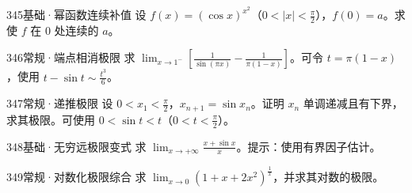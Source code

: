 \begin{exercise}{345}{基础·幂函数连续补值}
设 $f(x)=(\cos x)^{x^2}$（$0<|x|<\frac{\pi}{2}$），$f(0)=a$。求使 $f$ 在 $0$ 处连续的 $a$。
\end{exercise}
\begin{exercise}{346}{常规·端点相消极限}
求 $\lim_{x\to1^-}[\frac{1}{\sin(\pi x)}-\frac{1}{\pi(1-x)}]$。可令 $t=\pi(1-x)$，使用 $t-\sin t\sim\frac{t^3}{6}$。
\end{exercise}
\begin{exercise}{347}{常规·递推极限}
设 $0<x_1<\frac{\pi}{2}$，$x_{n+1}=\sin x_n$。证明 $x_n$ 单调递减且有下界，求其极限。可使用 $0<\sin t<t$（$0<t<\frac{\pi}{2}$）。
\end{exercise}
\begin{exercise}{348}{基础·无穷远极限变式}
求 $\lim_{x\to+\infty}\frac{x+\sin x}{x}$。提示：使用有界因子估计。
\end{exercise}
\begin{exercise}{349}{常规·对数化极限综合}
求 $\lim_{x\to0}(1+x+2x^2)^{\frac{1}{x}}$，并求其对数的极限。
\end{exercise}
